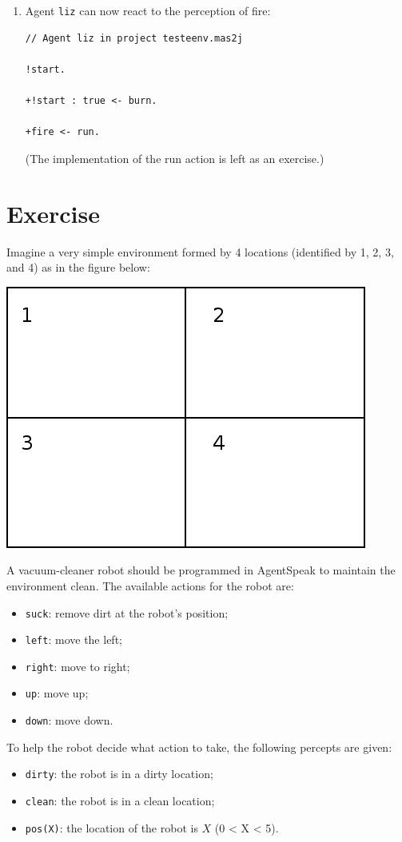\documentclass[a4paper]{article}
\begin{document}
\begin{enumerate}
\item Agent \texttt{liz} can now react to the perception of fire:
\begin{verbatim}
// Agent liz in project testeenv.mas2j

!start.

+!start : true <- burn.

+fire <- run.
\end{verbatim}

  (The implementation of the run action is left as an exercise.)
\end{enumerate}

\section{Exercise}

Imagine a very simple environment formed by 4 locations (identified by 1, 2, 3,
and 4) as in the figure below:

\begin{center}
\includegraphics{figures/ambiente.png}  
\end{center}

A vacuum-cleaner robot should be programmed in AgentSpeak to maintain
the environment clean. The available actions for the robot are:
\begin{itemize}
\item \texttt{suck}: remove dirt at the robot's position;
\item \texttt{left}: move the left;
\item \texttt{right}: move to right;
\item \texttt{up}: move up;
\item \texttt{down}: move down.
\end{itemize}
To help the robot decide what action to take, the following percepts
are given:
\begin{itemize}
\item \texttt{dirty}: the robot is in a dirty location; 
\item \texttt{clean}: the robot is in a clean location; 
\item \texttt{pos(X)}: the location of the robot is $X$ (0 < X < 5).
\end{itemize}
\end{document}
